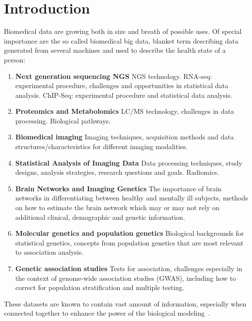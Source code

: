 \documentclass{standalone}
\begin{document}
\chapter*{Introduction}\label{Introduction}

Biomedical data are growing both in size and breath of possible uses.
Of special importance are the so called biomedical big data, blanket term describing data generated from several machines and used to describe the health state of a person:
\begin{enumerate}
\item\textbf{Next generation sequencing NGS} NGS technology. RNA-seq: experimental procedure, challenges and opportunities in statistical data analysis. ChIP-Seq: experimental procedure and statistical data analysis.
\item\textbf{Proteomics and Metabolomics} LC/MS technology, challenges in data processing. Biological pathways.
\item\textbf{Biomedical imaging} Imaging techniques, acquisition methods and data structures/characteristics for different imaging modalities.
\item\textbf{Statistical Analysis of Imaging Data} Data processing techniques, study designs, analysis strategies, research questions and goals. Radiomics.
\item\textbf{Brain Networks and Imaging Genetics} The importance of brain networks in differentiating between healthy and mentally ill subjects, methods on how to estimate the brain network which may or may not rely on additional clinical, demographic and genetic information.
\item\textbf{Molecular genetics and population genetics} Biological backgrounds for statistical genetics, concepts from population genetics that are most relevant to association analysis.
\item\textbf{Genetic association studies} Tests for association, challenges especially in the context of genome-wide association studies (GWAS), including how to correct for population stratification and multiple testing.
\end{enumerate}

These datasets are known to contain vast amount of information, especially when connected together to enhance the power of the biological modeling~\cite{Pooley2005, Castellani2016}.




\end{document}
